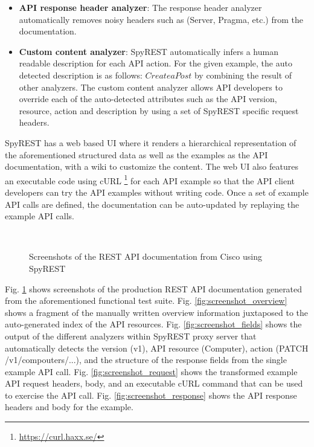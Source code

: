 \documentclass[10pt, conference]{IEEEtran}
\begin{document}
\begin{itemize}
  \item \textbf{API response header analyzer}: The response header analyzer automatically removes noisy headers such as (Server, Pragma, etc.) from the documentation.

  \item \textbf{Custom content analyzer}: SpyREST automatically infers a human readable description for each API action. For the given example, the auto detected description is as follows: $Create a Post$ by combining the result of other analyzers. The custom content analyzer allows API developers to override each of the auto-detected attributes such as the API version, resource, action and description by using a set of SpyREST specific request headers.
\end{itemize}

SpyREST has a web based UI where it renders a hierarchical representation of the aforementioned structured data as well as the examples as the API documentation, with a wiki to customize the content. The web UI also features an executable code using cURL \footnote{\url{https://curl.haxx.se/}} for each API example so that the API client developers can try the API examples without writing code. Once a set of example API calls are defined, the documentation can be auto-updated by replaying the example API calls.

\begin{figure}
\\
\caption{Screenshots of the REST API documentation from Cisco using SpyREST}
\label{fig:screenshot}
\end{figure}

Fig. \ref{fig:screenshot} shows screenshots of the production REST API documentation generated from the aforementioned functional test suite. Fig. \ref{fig:screenshot_overview} shows a fragment of the manually written overview information juxtaposed to the auto-generated index of the API resources. Fig. \ref{fig:screenshot_fields} shows the output of the different analyzers within SpyREST proxy server that automatically detects the version (v1), API resource (Computer), action (PATCH /v1/compouters/...), and the structure of the response fields from the single example API call. Fig. \ref{fig:screenshot_request} shows the transformed example API request headers, body, and an executable cURL command that can be used to exercise the API call. Fig. \ref{fig:screenshot_response} shows the API response headers and body for the example.
\end{document}
